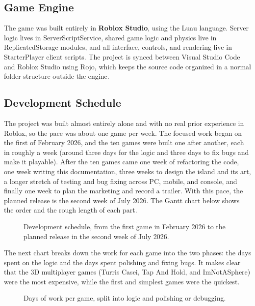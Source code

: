 \documentclass[12pt,letterpaper]{article}
\begin{document}
\subsection{Game Engine}

The game was built entirely in \textbf{Roblox Studio}, using the Luau language. Server logic lives in ServerScriptService, shared game logic and physics live in ReplicatedStorage modules, and all interface, controls, and rendering live in StarterPlayer client scripts. The project is synced between Visual Studio Code and Roblox Studio using Rojo, which keeps the source code organized in a normal folder structure outside the engine.

\subsection{Development Schedule}

The project was built almost entirely alone and with no real prior experience in Roblox, so the pace was about one game per week. The focused work began on the first of February 2026, and the ten games were built one after another, each in roughly a week (around three days for the logic and three days to fix bugs and make it playable). After the ten games came one week of refactoring the code, one week writing this documentation, three weeks to design the island and its art, a longer stretch of testing and bug fixing across PC, mobile, and console, and finally one week to plan the marketing and record a trailer. With this pace, the planned release is the second week of July 2026. The Gantt chart below shows the order and the rough length of each part.

\begin{figure}[H]
  \centering
  \resizebox{\textwidth}{!}{}
  \caption{Development schedule, from the first game in February 2026 to the planned release in the second week of July 2026.}
  \label{fig:gantt_schedule}
\end{figure}

The next chart breaks down the work for each game into the two phases: the days spent on the logic and the days spent polishing and fixing bugs. It makes clear that the 3D multiplayer games (Turris Casei, Tap And Hold, and ImNotASphere) were the most expensive, while the first and simplest games were the quickest.

\begin{figure}[H]
  \centering
  
  \caption{Days of work per game, split into logic and polishing or debugging.}
  \label{fig:barchart_days}
\end{figure}
\end{document}

